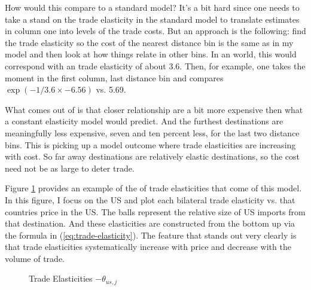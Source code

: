 \documentclass[12pt,pdftex]{article}
\begin{document}
\begin{onehalfspacing}
How would this compare to a standard model? It's a bit hard since one needs to take a stand on the trade elasticity in the standard model to translate estimates in column one into levels of the trade costs. But an approach is the following: find the trade elasticity so the cost of the nearest distance bin is the same as in my model and then look at how things relate in other bins. In an \citet{eaton2002technology} world, this would correspond with an trade elasticity of about 3.6. Then, for example, one takes the moment in the first column, last distance bin and compares $\exp( - 1 / 3.6 \times  -6.56)$ vs. 5.69.

What comes out of is that closer relationship are a bit more expensive then what a constant elasticity model would predict. And the furthest destinations are meaningfully less expensive, seven and ten percent less, for the last two distance bins. This is picking up a model outcome where trade elasticities are increasing with cost. So far away destinations are relatively elastic destinations, so the cost need not be as large to deter trade.

Figure \ref{fig:bilateral-elasticities} provides an example of the of trade elasticities that come of this model. In this figure, I focus on the US and plot each bilateral trade elasticity vs. that countries price in the US. The balls represent the relative size of US imports from that destination. And these elasticities are constructed from the bottom up via the formula in (\ref{eq:trade-elasticity}). The feature that stands out very clearly is that trade elasticities systematically increase with price and decrease with the volume of trade.

\begin{figure}[!t]
\caption{Trade Elasticities $-\theta_{us,j}$}\label{fig:bilateral-elasticities}
\end{figure}



\end{onehalfspacing}
\end{document}
